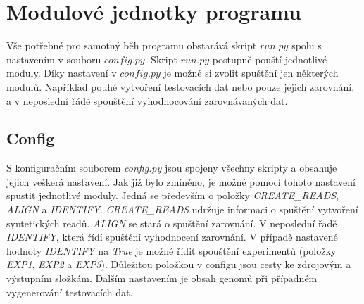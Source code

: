 \documentclass[czech,DP]{thesiskiv}
\numberwithin{equation}{section}
\begin{document}
\section{Modulové jednotky programu}
Vše potřebné pro samotný běh programu obstarává skript $run.py$ spolu s nastavením v souboru $config.py$. Skript $run.py$ postupně pouští jednotlivé moduly. Díky nastavení v $config.py$ je možné si zvolit spuštění jen některých modulů. Například pouhé vytvoření testovacích dat nebo pouze jejich zarovnání, a v neposlední řádě spouštění vyhodnocování zarovnávaných dat.

\subsection{Config}
S konfiguračním souborem \textit{config.py} jsou spojeny všechny skripty a obsahuje jejich veškerá nastavení. Jak již bylo zmíněno, je možné pomocí tohoto nastavení spustit jednotlivé moduly. Jedná se především o položky \textit{CREATE\_READS}, \textit{ALIGN} a \textit{IDENTIFY}. \textit{CREATE\_READS} udržuje informaci o spuštění vytvoření syntetických readů. \textit{ALIGN} se stará o spuštění zarovnání. V neposlední řadě \textit{IDENTIFY}, která řídí spuštění vyhodnocení zarovnání. V případě nastavené hodnoty \textit{IDENTIFY} na \textit{True} je možné řídit spouštění experimentů (položky \textit{EXP1}, \textit{EXP2} a \textit{EXP3}). Důležitou položkou v configu jsou cesty ke zdrojovým a výstupním složkám. Dalším nastavením je obsah genomů při případném vygenerování testovacích dat.
\end{document}
